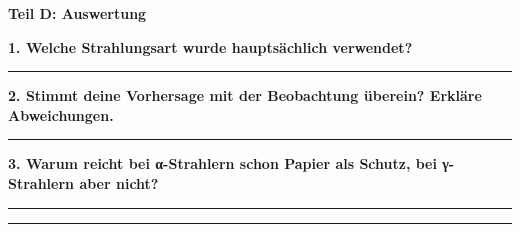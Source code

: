 \documentclass[10pt, a4paper]{article}
\newcommand{\fachfarbe}{physik}
\newcommand{\luecke}[1]{\rule{#1}{0.4pt}}
\newcommand{\abschnitt}[1]{%
    \vspace{8pt}\noindent\textbf{\textcolor{\fachfarbe}{#1}}\vspace{4pt}
}
\begin{document}
\vspace{12pt}

\abschnitt{Teil D: Auswertung}

\textbf{1. Welche Strahlungsart wurde hauptsächlich verwendet?}

\vspace{4pt}
\luecke{14cm}

\vspace{8pt}

\textbf{2. Stimmt deine Vorhersage mit der Beobachtung überein? Erkläre Abweichungen.}

\vspace{4pt}
\luecke{14cm}

\vspace{8pt}

\textbf{3. Warum reicht bei α-Strahlern schon Papier als Schutz, bei γ-Strahlern aber nicht?}

\vspace{4pt}
\luecke{14cm}

\vspace{4pt}
\luecke{14cm}
\end{document}
